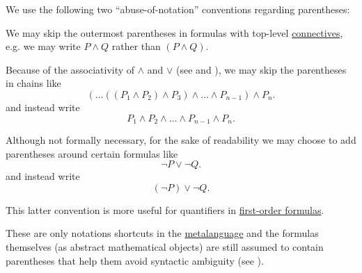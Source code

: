 \begin{remark}\label{rem:propositional_formula_parentheses}
  We use the following two \enquote{abuse-of-notation} conventions regarding parentheses:
  \begin{thmenum}
     We may skip the outermost parentheses in formulas with top-level \hyperref[def:propositional_language/connectives]{connectives}, e.g. we may write \( P \wedge Q \) rather than \( (P \wedge Q) \).

     Because of the associativity of \( \wedge \) and \( \vee \) (see  and ), we may skip the parentheses in chains like
    \begin{equation*}
      ( \ldots ((P_1 \wedge P_2) \wedge P_3) \wedge \ldots \wedge P_{n-1} ) \wedge P_n.
    \end{equation*}
    and instead write
    \begin{equation*}
      P_1 \wedge P_2 \wedge \ldots \wedge P_{n-1} \wedge P_n.
    \end{equation*}

     Although not formally necessary, for the sake of readability we may choose to add parentheses around certain formulas like
    \begin{equation*}
      \neg P \vee \neg Q.
    \end{equation*}
    and instead write
    \begin{equation*}
      (\neg P) \vee \neg Q.
    \end{equation*}

    This latter convention is more useful for quantifiers in \hyperref[def:first_order_syntax/formula]{first-order formulas}.
  \end{thmenum}

  These are only notations shortcuts in the \hyperref[sec:mathematical_logic]{metalanguage} and the formulas themselves (as abstract mathematical objects) are still assumed to contain parentheses that help them avoid syntactic ambiguity (see ).
\end{remark}

